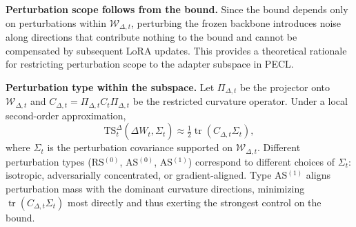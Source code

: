 \textbf{Perturbation scope follows from the bound.}
Since the bound depends only on perturbations within $\mathcal{W}_{\Delta,t}$, perturbing the frozen backbone introduces noise along directions that contribute nothing to the bound and cannot be compensated by subsequent LoRA updates.
This provides a theoretical rationale for restricting perturbation scope to the adapter subspace in PECL.

\textbf{Perturbation type within the subspace.}
Let $\Pi_{\Delta,t}$ be the projector onto $\mathcal{W}_{\Delta,t}$ and $C_{\Delta,t} = \Pi_{\Delta,t} C_t \Pi_{\Delta,t}$ be the restricted curvature operator.
Under a local second-order approximation,
\[
\mathrm{TS}_t^\Delta(\widehat{\Delta W}_t, \Sigma_t) \approx \tfrac{1}{2}\operatorname{tr}(C_{\Delta,t} \Sigma_t),
\]
where $\Sigma_t$ is the perturbation covariance supported on $\mathcal{W}_{\Delta,t}$.
Different perturbation types (RS$^{(0)}$, AS$^{(0)}$, AS$^{(1)}$) correspond to different choices of $\Sigma_t$: isotropic, adversarially concentrated, or gradient-aligned.
Type AS$^{(1)}$ aligns perturbation mass with the dominant curvature directions, minimizing $\operatorname{tr}(C_{\Delta,t}\Sigma_t)$ most directly and thus exerting the strongest control on the bound.
